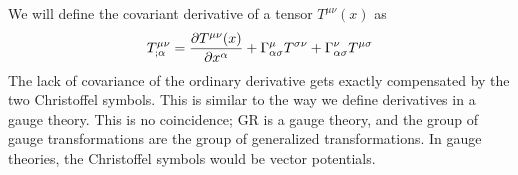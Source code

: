 \documentclass[a4paper,twoside,master.tex]{subfiles}
\begin{document}
We will define the covariant derivative of a tensor $ T^{\mu \nu}(x) $ as
\begin{equation}
    T^{\mu \nu}_{; \alpha} = \pdv{T^{\mu \nu}(x)}{x^{\alpha}} + \Gamma^{\mu}_{\alpha \sigma} T^{\sigma \nu} + \Gamma^{\nu}_{\alpha \sigma} T^{\mu \sigma}
\end{equation}
The lack of covariance of the ordinary derivative gets exactly compensated by the two Christoffel symbols. This is similar to the way we define derivatives in a gauge theory. This is no coincidence; GR is a gauge theory, and the group of gauge transformations are the group of generalized transformations. In gauge theories, the Christoffel symbols would be vector potentials.
\end{document}
